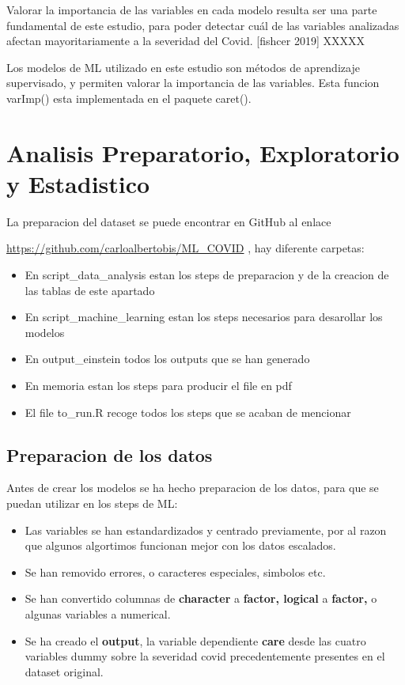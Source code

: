 \documentclass[
]{article}
\begin{document}
Valorar la importancia de las variables en cada modelo resulta ser una
parte fundamental de este estudio, para poder detectar cuál de las
variables analizadas afectan mayoritariamente a la severidad del Covid.
{[}fishcer 2019{]} XXXXX

Los modelos de ML utilizado en este estudio son métodos de aprendizaje
supervisado, y permiten valorar la importancia de las variables. Esta
funcion varImp() esta implementada en el paquete caret().

\pagebreak

\hypertarget{analisis-preparatorio-exploratorio-y-estadistico}{%
\section{Analisis Preparatorio, Exploratorio y
Estadistico}\label{analisis-preparatorio-exploratorio-y-estadistico}}

La preparacion del dataset se puede encontrar en GitHub al enlace

\url{https://github.com/carloalbertobis/ML_COVID} , hay diferente
carpetas:

\begin{itemize}
\item
  En script\_data\_analysis estan los steps de preparacion y de la
  creacion de las tablas de este apartado
\item
  En script\_machine\_learning estan los steps necesarios para
  desarollar los modelos
\item
  En output\_einstein todos los outputs que se han generado
\item
  En memoria estan los steps para producir el file en pdf
\item
  El file to\_run.R recoge todos los steps que se acaban de mencionar
\end{itemize}

\hypertarget{preparacion-de-los-datos}{%
\subsection{Preparacion de los datos}\label{preparacion-de-los-datos}}

Antes de crear los modelos se ha hecho preparacion de los datos, para
que se puedan utilizar en los steps de ML:

\begin{itemize}
\item
  Las variables se han estandardizados y centrado previamente, por al
  razon que algunos algortimos funcionan mejor con los datos escalados.
\item
  Se han removido errores, o caracteres especiales, simbolos etc.
\item
  Se han convertido columnas de \textbf{character} a \textbf{factor,
  logical} a \textbf{factor,} o algunas variables a numerical.
\item
  Se ha creado el \textbf{output}, la variable dependiente \textbf{care}
  desde las cuatro variables dummy sobre la severidad covid
  precedentemente presentes en el dataset original.
\end{itemize}
\end{document}
